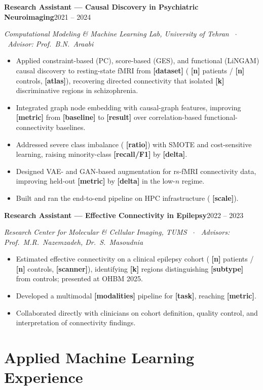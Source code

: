 \documentclass[10pt,a4paper]{article}
\newif\ifdraft
\newcommand{\fillme}[1]{%
  \ifdraft{\color{todo}\bfseries[FILL: #1]}\else\textbf{[#1]}\fi}
\newcommand{\role}[3]{%
  \par\vspace{4pt}%
  \textbf{#1}\hfill{\color{muted}\small #3}\par
  \textit{\color{muted}\small #2}\par\vspace{1.5pt}}
\begin{document}
\role{Research Assistant --- Causal Discovery in Psychiatric Neuroimaging}{Computational Modeling \& Machine Learning Lab, University of Tehran \ $\cdot$ \ Advisor: Prof.\ B.N.\ Araabi}{2021 -- 2024}
\begin{itemize}
  \item Applied constraint-based (PC), score-based (GES), and functional (LiNGAM) causal discovery
        to resting-state fMRI from \fillme{dataset} (\fillme{n} patients / \fillme{n} controls,
        \fillme{atlas}), recovering directed connectivity that isolated \fillme{k} discriminative
        regions in schizophrenia.
  \item Integrated graph node embedding with causal-graph features, improving \fillme{metric}
        from \fillme{baseline} to \fillme{result} over correlation-based functional-connectivity
        baselines.
  \item Addressed severe class imbalance (\fillme{ratio}) with SMOTE and cost-sensitive learning,
        raising minority-class \fillme{recall/F1} by \fillme{delta}.
  \item Designed VAE- and GAN-based augmentation for rs-fMRI connectivity data, improving held-out
        \fillme{metric} by \fillme{delta} in the low-$n$ regime.
  \item Built and ran the end-to-end pipeline on HPC infrastructure (\fillme{scale}).
\end{itemize}

\role{Research Assistant --- Effective Connectivity in Epilepsy}{Research Center for Molecular \& Cellular Imaging, TUMS \ $\cdot$ \ Advisors: Prof.\ M.R.\ Nazemzadeh, Dr.\ S.\ Masoudnia}{2022 -- 2023}
\begin{itemize}
  \item Estimated effective connectivity on a clinical epilepsy cohort (\fillme{n} patients /
        \fillme{n} controls, \fillme{scanner}), identifying \fillme{k} regions distinguishing
        \fillme{subtype} from controls; presented at OHBM 2025.
  \item Developed a multimodal \fillme{modalities} pipeline for \fillme{task}, reaching
        \fillme{metric}.
  \item Collaborated directly with clinicians on cohort definition, quality control, and
        interpretation of connectivity findings.
\end{itemize}

\section{Applied Machine Learning Experience}
\end{document}
